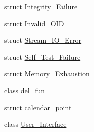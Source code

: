 \begin{DoxyCompactItemize}
struct \hyperlink{structBotan_1_1Integrity__Failure}{Integrity\-\_\-\-Failure}
\item 
struct \hyperlink{structBotan_1_1Invalid__OID}{Invalid\-\_\-\-O\-I\-D}
\item 
struct \hyperlink{structBotan_1_1Stream__IO__Error}{Stream\-\_\-\-I\-O\-\_\-\-Error}
\item 
struct \hyperlink{structBotan_1_1Self__Test__Failure}{Self\-\_\-\-Test\-\_\-\-Failure}
\item 
struct \hyperlink{structBotan_1_1Memory__Exhaustion}{Memory\-\_\-\-Exhaustion}
\item 
class \hyperlink{classBotan_1_1del__fun}{del\-\_\-fun}
\item 
struct \hyperlink{structBotan_1_1calendar__point}{calendar\-\_\-point}
\item 
class \hyperlink{classBotan_1_1User__Interface}{User\-\_\-\-Interface}
\end{DoxyCompactItemize}
